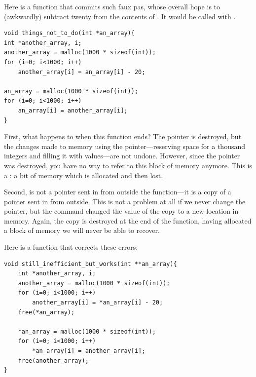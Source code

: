 Here is a function that commits such faux pas,
whose overall hope is to (awkwardly) subtract twenty from
the contents of . It would be called with
.  
\begin{lstlisting}
void things_not_to_do(int *an_array){
int *another_array, i;
another_array = malloc(1000 * sizeof(int));
for (i=0; i<1000; i++)
    another_array[i] = an_array[i] - 20;

an_array = malloc(1000 * sizeof(int));
for (i=0; i<1000; i++)
    an_array[i] = another_array[i];
}
\end{lstlisting}

First, what happens to  when this function
ends? The pointer is destroyed, but the changes made to memory using
the pointer---reserving space for a thousand integers and filling it
with values---are not undone. However, since the pointer was destroyed,
you have no way to refer to this block of memory anymore.  This is a
: a bit of memory which is allocated and then lost.

Second,  is not a pointer sent in from outside the
function---it is a copy of a pointer sent in from outside. This is not
a problem at all if we never change the pointer, but the command
 changed the value of the copy
 to a new location in memory.  Again, the copy is
destroyed at the end of the function, having allocated a block of memory
we will never be able to recover.

Here is a function that corrects these errors:

\begin{lstlisting}
void still_inefficient_but_works(int **an_array){
    int *another_array, i;
    another_array = malloc(1000 * sizeof(int));
    for (i=0; i<1000; i++)
        another_array[i] = *an_array[i] - 20;
    free(*an_array);

    *an_array = malloc(1000 * sizeof(int));
    for (i=0; i<1000; i++)
        *an_array[i] = another_array[i];
    free(another_array);
}
\end{lstlisting}


